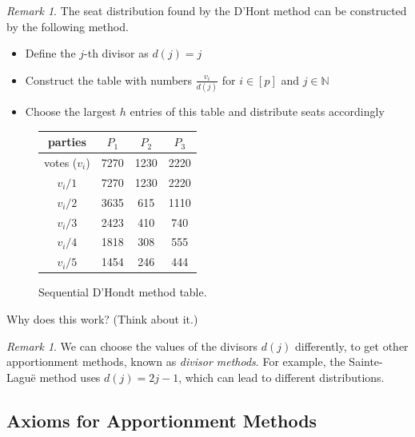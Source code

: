 \documentclass{book}
\theoremstyle{plain}
\theoremstyle{definition}
\theoremstyle{remark}
\newtheorem{remark}[theorem]{Remark}
\begin{document}
\begin{remark}
    The seat distribution found by 
    the D'Hont method can be constructed by the following method.

    \begin{itemize}
        \item Define the $j$-th divisor as 
        $d(j) = j$
        \item Construct the table with numbers $\frac{v_i}{d(j)}$ for $i \in [p]$ and $j \in \mathbb{N}$
        
        \item Choose the largest $h$ entries of this table and 
        distribute seats accordingly
    \end{itemize}

    \begin{figure}[H] 
        \begin{center}
        \begin{tabular}{c c c c}
            \hline
            parties & $P_1$ & $P_2$ & $P_3$ \\
            \hline
            votes ($v_i$) & 7270 & 1230 & 2220 \\
            \hline
            $v_i/1$ & 7270 & 1230 & 2220 \\
            $v_i/2$ & 3635 & 615 & 1110 \\
            $v_i/3$ & 2423 & 410 & 740 \\
            $v_i/4$ & 1818 & 308 & 555 \\
            $v_i/5$ & 1454 & 246 & 444 \\
            \hline
        \end{tabular}
        \end{center}
        \caption{Sequential D'Hondt method table.}
    \end{figure}


    Why does this work? (Think about it.)
\end{remark}

\begin{remark}
    We can choose the values of 
    the divisors $d(j)$ differently, to get other 
    apportionment methods, known as \emph{divisor methods}.
    For example, the Sainte-Laguë method uses $d(j) = 2j - 1$, 
    which can lead to different distributions.
\end{remark}

\subsection{Axioms for Apportionment Methods}
\end{document}
